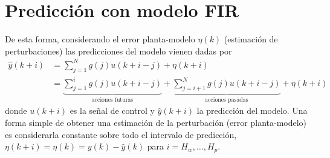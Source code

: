 \section{Predicci{\'o}n con modelo FIR}\label{A_2}
De esta forma, considerando el error planta-modelo $\eta(k)$ (estimaci{\'o}n de perturbaciones) las predicciones
del modelo vienen dadas por
\begin{equation}
\begin{split}
\hat{y}(k+i) &= \sum_{j=1}^{N}g(j)u(k+i-j) + \eta(k+i)\\
             &= \underbrace{\sum_{j=1}^{i}g(j)u(k+i-j)}_{\text{acciones futuras}}+
                \underbrace{\sum_{j=i+1}^{N}g(j)u(k+i-j)}_{\text{acciones pasadas}}+ \eta(k+i)
\end{split}
\end{equation}
donde $u(k+i)$ es la se{\~n}al de control y $\hat{y}(k+i)$ la predicci{\'o}n del modelo. Una forma simple de obtener
una estimaci{\'o}n de la perturbaci{\'o}n (error planta-modelo) es considerarla constante sobre todo el intervalo de
predicci{\'o}n, $\eta(k+i)=\eta(k)=y(k)-\hat{y}(k)$ para $i=H_w,\ldots,H_p$.

